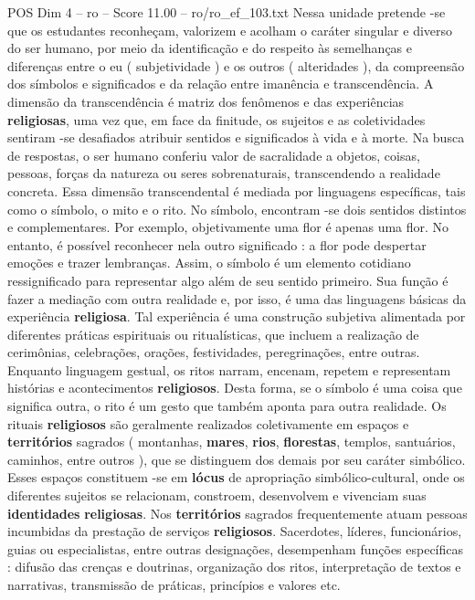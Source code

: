 \begin{textsample}{POS Dim 4 – ro – Score 11.00 – ro/ro\_ef\_103.txt}
Nessa unidade pretende -se que os estudantes reconheçam, valorizem e acolham o caráter singular e diverso do ser humano, por meio da identificação e do respeito às semelhanças e diferenças entre o eu ( subjetividade ) e os outros ( alteridades ), da compreensão dos símbolos e significados e da relação entre imanência e transcendência.
A dimensão da transcendência é matriz dos fenômenos e das experiências \textbf{religiosas}, uma vez que, em face da finitude, os sujeitos e as coletividades sentiram -se desafiados atribuir sentidos e significados à vida e à morte.
Na busca de respostas, o ser humano conferiu valor de sacralidade a objetos, coisas, pessoas, forças da natureza ou seres sobrenaturais, transcendendo a realidade concreta.
Essa dimensão transcendental é mediada por linguagens específicas, tais como o símbolo, o mito e o rito.
No símbolo, encontram -se dois sentidos distintos e complementares.
Por exemplo, objetivamente uma flor é apenas uma flor.
No entanto, é possível reconhecer nela outro significado : a flor pode despertar emoções e trazer lembranças.
Assim, o símbolo é um elemento cotidiano ressignificado para representar algo além de seu sentido primeiro.
Sua função é fazer a mediação com outra realidade e, por isso, é uma das linguagens básicas da experiência \textbf{religiosa}.
Tal experiência é uma construção subjetiva alimentada por diferentes práticas espirituais ou ritualísticas, que incluem a realização de cerimônias, celebrações, orações, festividades, peregrinações, entre outras.
Enquanto linguagem gestual, os ritos narram, encenam, repetem e representam histórias e acontecimentos \textbf{religiosos}.
Desta forma, se o símbolo é uma coisa que significa outra, o rito é um gesto que também aponta para outra realidade.
Os rituais \textbf{religiosos} são geralmente realizados coletivamente em espaços e \textbf{territórios} sagrados ( montanhas, \textbf{mares}, \textbf{rios}, \textbf{florestas}, templos, santuários, caminhos, entre outros ), que se distinguem dos demais por seu caráter simbólico.
Esses espaços constituem -se em \textbf{lócus} de apropriação simbólico-cultural, onde os diferentes sujeitos se relacionam, constroem, desenvolvem e vivenciam suas \textbf{identidades} \textbf{religiosas}.
Nos \textbf{territórios} sagrados frequentemente atuam pessoas incumbidas da prestação de serviços \textbf{religiosos}.
Sacerdotes, líderes, funcionários, guias ou especialistas, entre outras designações, desempenham funções específicas : difusão das crenças e doutrinas, organização dos ritos, interpretação de textos e narrativas, transmissão de práticas, princípios e valores etc.

\end{textsample}
